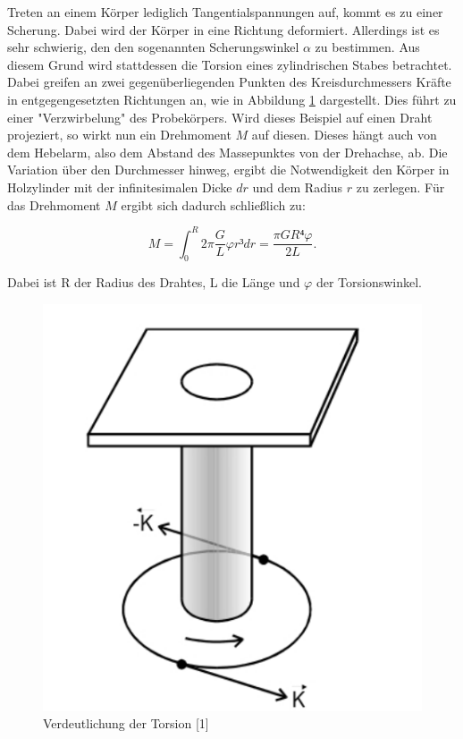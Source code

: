 Treten an einem Körper lediglich Tangentialspannungen auf, kommt es zu einer 
Scherung. Dabei wird der Körper in eine Richtung deformiert. Allerdings ist es 
sehr schwierig, den den sogenannten Scherungswinkel $\alpha$ zu bestimmen. 
Aus diesem Grund wird stattdessen die Torsion eines zylindrischen Stabes 
betrachtet. Dabei greifen an zwei gegenüberliegenden Punkten des Kreisdurchmessers
Kräfte in entgegengesetzten Richtungen an, wie in Abbildung \ref{fig:Torsion} dargestellt. 
Dies führt zu einer "Verzwirbelung" des
Probekörpers. Wird dieses Beispiel auf einen Draht projeziert, so wirkt nun
ein Drehmoment $M$ auf diesen. Dieses hängt auch von dem Hebelarm, also dem 
Abstand des Massepunktes von der Drehachse, ab. Die Variation über den 
Durchmesser hinweg, ergibt die Notwendigkeit den Körper in Holzylinder mit 
der infinitesimalen Dicke $dr$ und dem Radius $r$ zu zerlegen. 
Für das Drehmoment $M$ ergibt sich dadurch schließlich zu: 

\begin{equation}
M = \int_0^R 2\pi \frac{G}{L} \varphi r³ dr = \frac{\pi G R⁴ \varphi}{2 L}.
\end{equation}

Dabei ist R der Radius des Drahtes, L die Länge und $\varphi$ der Torsionswinkel. 

\begin{figure}
  \centering
  \includegraphics[scale=0.3]{content/Torsion.png}
  \caption{Verdeutlichung der Torsion [1]}
  \label{fig:Torsion}
\end{figure}

